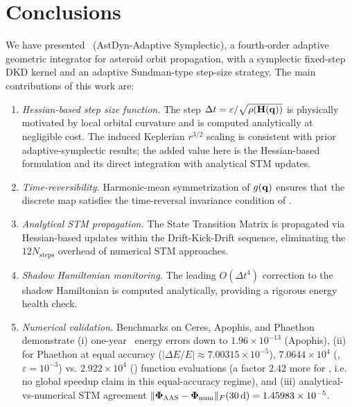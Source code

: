 
\section{Conclusions}
\label{sec:conclusions}

We have presented \AAS\ (AstDyn-Adaptive Symplectic), a fourth-order
adaptive geometric integrator for asteroid orbit propagation,
with a symplectic fixed-step DKD kernel and an adaptive
Sundman-type step-size strategy.
The main contributions of this work are:

\begin{enumerate}

  \item \textit{Hessian-based step size function.}
    The step $\Delta t = \varepsilon / \sqrt{\rho(\mathbf{H}(\mathbf{q}))}$
    is physically motivated by local orbital curvature and is computed
    analytically at negligible cost. The induced Keplerian
    $r^{3/2}$ scaling is consistent with prior adaptive-symplectic
    results; the added value here is the Hessian-based formulation and
    its direct integration with analytical STM updates.

  \item \textit{Time-reversibility.}
    Harmonic-mean symmetrization of $g(\mathbf{q})$ ensures that the
    discrete map satisfies the time-reversal invariance condition
    of \citet{PretoTremaine1999}.

  \item \textit{Analytical STM propagation.}
    The State Transition Matrix is propagated via Hessian-based
    updates within the Drift-Kick-Drift sequence, eliminating the
    $12N_{\mathrm{steps}}$ overhead of numerical STM approaches.

  \item \textit{Shadow Hamiltonian monitoring.}
    The leading $O(\Delta t^4)$ correction to the shadow Hamiltonian
    is computed analytically, providing a rigorous energy health check.

  \item \textit{Numerical validation.}
    Benchmarks on Ceres, Apophis, and Phaethon demonstrate
    (i) one-year \AAS\ energy errors down to
    $1.96\times10^{-13}$ (Apophis),
    (ii) for Phaethon at equal accuracy
    ($|\Delta E/E|\approx7.00315\times10^{-5}$),
    $7.0644\times10^4$ (\AAS, $\varepsilon=10^{-3}$)
    vs.
    $2.922\times10^4$ (\saba) function evaluations
    (a factor $2.42$ more for \AAS, i.e.
    no global speedup claim in this equal-accuracy regime), and
    (iii) analytical-vs-numerical STM agreement
    $\|\boldsymbol{\Phi}_{\textsc{AAS}}-\boldsymbol{\Phi}_{\mathrm{num}}\|_F(30\,\mathrm{d})
    =1.45983\times10^{-5}$.

\end{enumerate}

